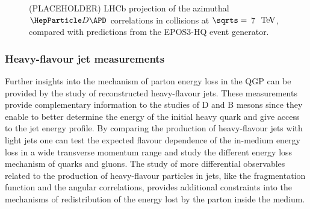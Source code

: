 \begin{figure}
\centering
{}
\caption{(PLACEHOLDER) LHCb projection of the azimuthal $\PD \APD$ correlations in \pp collisions at $\sqrts=$ 7 $~\text{TeV}$, compared with predictions from the EPOS3-HQ event generator.}
\label{fig:DD}
\end {figure}


\subsubsection{Heavy-flavour jet measurements}
Further insights into the mechanism of parton energy loss in the QGP can be provided by the study of reconstructed heavy-flavour jets. These measurements provide complementary information to the studies of D and B mesons since they enable to better determine the energy of the initial heavy quark and give access to the jet energy profile. By comparing the production of heavy-flavour jets with light jets one can test the expected flavour dependence of the in-medium energy loss in a wide transverse momentum range and study the different energy loss mechanism of quarks and gluons. The study of more differential observables related to the production of heavy-flavour particles in jets, like the fragmentation function and the angular correlations, provides additional constraints into the mechanisms of redistribution of the energy lost by the parton inside the medium. %


